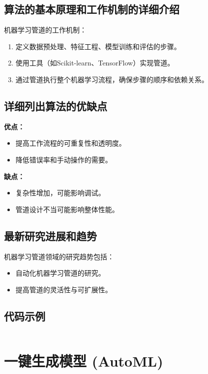 \subsection*{算法的基本原理和工作机制的详细介绍}
机器学习管道的工作机制：
\begin{enumerate}
    \item 定义数据预处理、特征工程、模型训练和评估的步骤。
    \item 使用工具（如Scikit-learn、TensorFlow）实现管道。
    \item 通过管道执行整个机器学习流程，确保步骤的顺序和依赖关系。
\end{enumerate}

\subsection*{详细列出算法的优缺点}
\textbf{优点：}
\begin{itemize}
    \item 提高工作流程的可重复性和透明度。
    \item 降低错误率和手动操作的需要。
\end{itemize}

\textbf{缺点：}
\begin{itemize}
    \item 复杂性增加，可能影响调试。
    \item 管道设计不当可能影响整体性能。
\end{itemize}

\subsection*{最新研究进展和趋势}
机器学习管道领域的研究趋势包括：
\begin{itemize}
    \item 自动化机器学习管道的研究。
    \item 提高管道的灵活性与可扩展性。
\end{itemize}
\subsection*{代码示例}
\begin{lstlisting}

\end{lstlisting}


\section{一键生成模型 (AutoML)}
